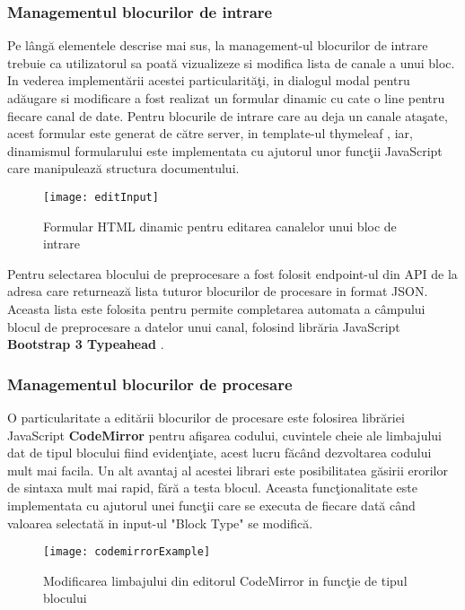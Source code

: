 \subsubsection{Managementul blocurilor de intrare}
Pe lângă elementele descrise mai sus, la management-ul blocurilor de intrare trebuie ca utilizatorul sa poată vizualizeze si modifica lista de canale a unui bloc. In vederea implementării acestei particularităţi, in dialogul modal pentru adăugare si modificare a fost realizat un formular dinamic cu cate o line pentru fiecare canal de date. Pentru blocurile de intrare care au deja un canale ataşate, acest formular este generat de către server, in template-ul thymeleaf , iar, dinamismul formularului este implementata cu ajutorul unor funcţii JavaScript care manipulează structura documentului.
\begin{figure}[H]
	\centering
	\texttt{[image: editInput]}
	\caption{Formular HTML dinamic pentru editarea canalelor unui bloc de intrare }
	\label{fig:editInput}
\end{figure}
Pentru selectarea blocului de preprocesare a fost folosit endpoint-ul din API de la adresa  care returnează lista tuturor blocurilor de procesare in format JSON. Aceasta lista este folosita pentru permite completarea automata a câmpului blocul de preprocesare a datelor unui canal, folosind librăria JavaScript \textbf{Bootstrap 3 Typeahead} \autocite{typeahead}.

\subsubsection{Managementul blocurilor de procesare}
O particularitate a editării blocurilor de procesare este folosirea librăriei JavaScript \textbf{CodeMirror}\autocite{codemirror} pentru afişarea codului, cuvintele cheie ale limbajului dat de tipul blocului fiind evidenţiate, acest lucru făcând dezvoltarea codului mult mai facila. Un alt avantaj al acestei librari este posibilitatea găsirii erorilor de sintaxa mult mai rapid, fără a testa blocul. Aceasta funcţionalitate este implementata cu ajutorul unei funcţii care se executa de fiecare dată când valoarea selectată in input-ul "Block Type" se modifică.
\begin{figure}[H]
	\centering
	\texttt{[image: codemirrorExample]}
	\caption{Modificarea limbajului din editorul CodeMirror in funcţie de tipul blocului}
	\label{fig:codemirrorExample}
\end{figure}
